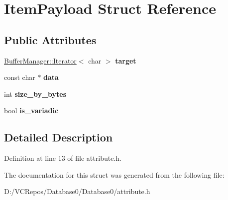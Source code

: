 \hypertarget{struct_item_payload}{}\section{Item\+Payload Struct Reference}
\label{struct_item_payload}
\subsection*{Public Attributes}
\begin{DoxyCompactItemize}
\item 
\mbox{\label{struct_item_payload_a1f0ab45ec529c736dc66614e7536da5b}} 
\mbox{\hyperlink{class_buffer_manager_1_1_iterator}{Buffer\+Manager\+::\+Iterator}}$<$ char $>$ {\bfseries target}
\item 
\mbox{\label{struct_item_payload_a4250f160479f5585b66b715cf3041ef4}} 
const char $\ast$ {\bfseries data}
\item 
\mbox{\label{struct_item_payload_a0ab6a44e0031313b4c27ca3dd4427de4}} 
int {\bfseries size\+\_\+by\+\_\+bytes}
\item 
\mbox{\label{struct_item_payload_a3b51290d17ac96f083c29196812965e7}} 
bool {\bfseries is\+\_\+variadic}
\end{DoxyCompactItemize}


\subsection{Detailed Description}


Definition at line 13 of file attribute.\+h.



The documentation for this struct was generated from the following file\+:\begin{DoxyCompactItemize}
\item 
D\+:/\+V\+C\+Repos/\+Database0/\+Database0/attribute.\+h\end{DoxyCompactItemize}
